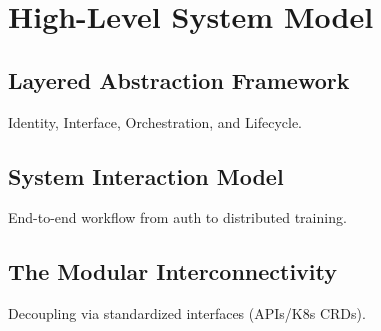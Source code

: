 \section{High-Level System Model}

\subsection{Layered Abstraction Framework}

Identity, Interface, Orchestration, and Lifecycle.

\subsection{System Interaction Model}

End-to-end workflow from auth to distributed training.

\subsection{The Modular Interconnectivity}

Decoupling via standardized interfaces (APIs/K8s CRDs).
